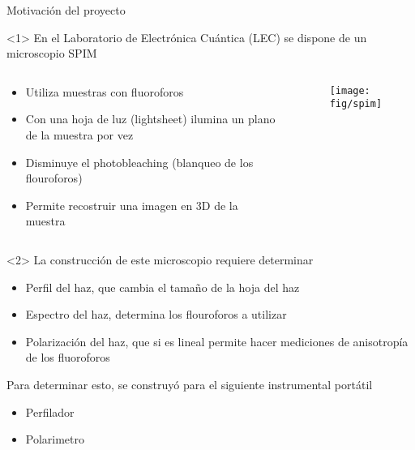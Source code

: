 \begin{frame}[t,plain]
\titlepage
\end{frame}



\begin{frame}[t]{Motivación del proyecto}

\begin{onlyenv}<1>
En el Laboratorio de Electrónica Cuántica (LEC) se dispone de un microscopio SPIM

\begin{columns}
    \begin{column}{0.5\textwidth}
        \begin{itemize}
            \item Utiliza muestras con fluoroforos
            \item Con una hoja de luz (lightsheet) ilumina un plano de la muestra por vez
            \item Disminuye el photobleaching (blanqueo de los flouroforos)
            \item Permite recostruir una imagen en 3D de la muestra
        \end{itemize}
    \end{column}
    \begin{column}{0.5\textwidth}
        \begin{figure}[H]
            \centering
            \texttt{[image: fig/spim]}
            \label{fig:spim} 
        \end{figure}
    \end{column}
\end{columns}
\end{onlyenv}

\begin{onlyenv}<2>
    La construcción de este microscopio requiere determinar
    \begin{itemize}
        \item Perfil del haz, que cambia el tamaño de la hoja del haz
        \item Espectro del haz, determina los flouroforos a utilizar
        \item Polarización del haz, que si es lineal permite hacer mediciones de anisotropía de los fluoroforos
    \end{itemize}
Para determinar esto, se construyó para el siguiente instrumental portátil
\begin{itemize}
    \item Perfilador
    \item Polarimetro
\end{itemize}
\end{onlyenv}

\end{frame}



